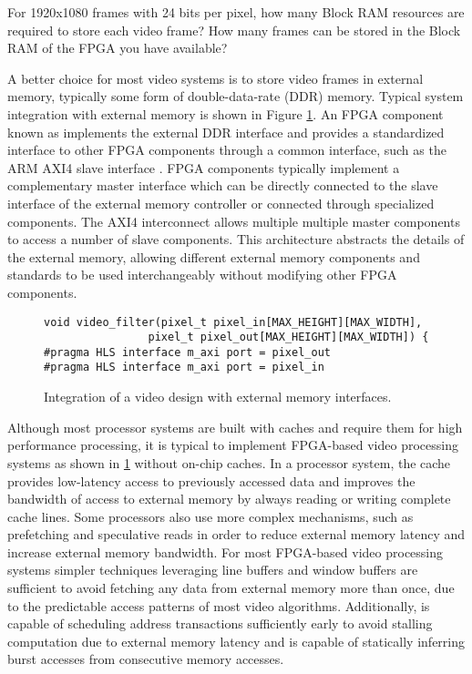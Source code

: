 \begin{exercise}
For 1920x1080 frames with 24 bits per pixel, how many Block RAM resources are required to store each video frame?  How many frames can be stored in the Block RAM of the FPGA you have available?
\end{exercise}

A better choice for most video systems is to store video frames in external memory, typically some form of double-data-rate (DDR) memory.  Typical system integration with external memory is shown in Figure \ref{fig:video:DDR_interface}.   An FPGA component known as  implements the external DDR interface and provides a standardized interface to other FPGA components through a common interface, such as the ARM AXI4 slave interface \cite{ARMAXI4}.   FPGA components typically implement a complementary master interface which can be directly connected to the slave interface of the external memory controller or connected through specialized  components.  The AXI4 interconnect allows multiple multiple master components to access a number of slave components.  This architecture abstracts the details of the external memory, allowing different external memory components and standards to be used interchangeably without modifying other FPGA components.   

\begin{figure}
\centering
\framebox{}
\begin{lstlisting}
void video_filter(pixel_t pixel_in[MAX_HEIGHT][MAX_WIDTH],
				pixel_t pixel_out[MAX_HEIGHT][MAX_WIDTH]) {
#pragma HLS interface m_axi port = pixel_out
#pragma HLS interface m_axi port = pixel_in
\end{lstlisting}
\caption{Integration of a video design with external memory interfaces.}\label{fig:video:DDR_interface}
\end{figure}

Although most processor systems are built with caches and require them for high performance processing, it is typical to implement FPGA-based video processing systems as shown in \ref{fig:video:DDR_interface} without on-chip caches.  In a processor system, the cache provides low-latency access to previously accessed data and improves the bandwidth of access to external memory by always reading or writing complete cache lines. Some processors also use more complex mechanisms, such as prefetching and speculative reads in order to reduce external memory latency and increase external memory bandwidth.  For most FPGA-based video processing systems simpler techniques leveraging line buffers and window buffers are sufficient to avoid fetching any data from external memory more than once, due to the predictable access patterns of most video algorithms.  Additionally, \VHLS is capable of scheduling address transactions sufficiently early to avoid stalling computation due to external memory latency and is capable of statically inferring burst accesses from consecutive memory accesses.

